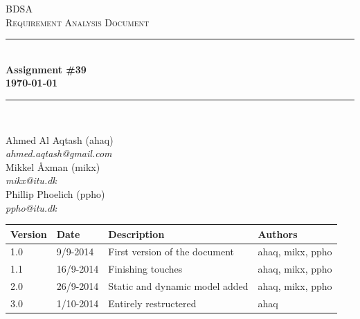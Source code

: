 \documentclass[10pt]{report}
\numberwithin{equation}{section} %
\numberwithin{figure}{section} %
\numberwithin{table}{section} %
\newcommand{\HRule}{\rule{\linewidth}{0.5mm}}
\begin{document}
\begin{titlepage}

\begin{center}

\textsc{\LARGE BDSA}\\[1.5cm]

\textsc{\Large Requirement Analysis Document}\\[0.5cm]

\HRule \\[0.4cm]

{ \bfseries Assignment \#39 \\[0.5cm] 
    {\small \today}} \\[0.7cm]

\HRule \\ [6.5cm]

\begin{minipage}{0.5\textwidth}
\begin{flushleft} \large
Ahmed Al Aqtash (ahaq)\\
\textit{ahmed.aqtash@gmail.com}\\
Mikkel Åxman (mikx)\\
\textit{mikx@itu.dk}\\
Phillip Phoelich (ppho)\\
\textit{ppho@itu.dk}\\

\vfill 
\end{flushleft}
\end{minipage}

\end{center}

\end{titlepage}
\clearpage
\begin{table}[h]
\begin{tabularx}{\textwidth}{l l X l}
\textbf{Version} & \textbf{Date} & \textbf{Description} & \textbf{Authors} \\ \midrule
1.0     & 9/9-2014 & First version of the document & ahaq, mikx, ppho \\
1.1     & 16/9-2014& Finishing touches             & ahaq, mikx, ppho \\
2.0     & 26/9-2014& Static and dynamic model added & ahaq, mikx, ppho \\
3.0     & 1/10-2014 & Entirely restructered                    & ahaq\\
\end{tabularx}
\end{table}
\end{document}
